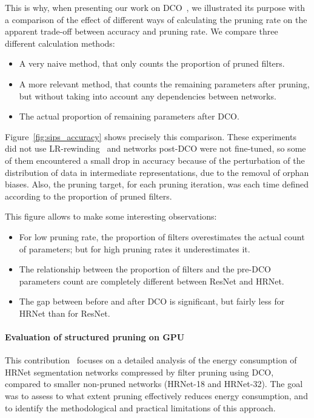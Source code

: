 \documentclass[11pt]{report}
\begin{document}
This is why, when presenting our work on DCO~\cite{tessier:hal-03767634}, we illustrated its purpose with a comparison of the effect of different ways of calculating the pruning rate on the apparent trade-off between accuracy and pruning rate. We compare three different calculation methods:
\begin{itemize}
  \item A very naive method, that only counts the proportion of pruned filters.
  \item A more relevant method, that counts the remaining parameters after pruning, but without taking into account any dependencies between networks.
  \item The actual proportion of remaining parameters after DCO.
\end{itemize}





Figure~\ref{fig:sips_accuracy} shows precisely this comparison. These experiments did not use LR-rewinding~\cite{renda2020comparing} and networks post-DCO were not fine-tuned, so some of them encountered a small drop in accuracy because of the perturbation of the distribution of data in intermediate representations, due to the removal of orphan biases. Also, the pruning target, for each pruning iteration, was each time defined according to the proportion of pruned filters.

This figure allows to make some interesting observations:
\begin{itemize}
  \item For low pruning rate, the proportion of filters overestimates the actual count of parameters; but for high pruning rates it underestimates it.
  \item The relationship between the proportion of filters and the pre-DCO parameters count are completely different between ResNet and HRNet.
  \item The gap between before and after DCO is significant, but fairly less for HRNet than for ResNet.
\end{itemize}


\paragraph{Evaluation of structured pruning on GPU}

This contribution~\cite{tessier:hal-03767636} focuses on a detailed analysis of the energy consumption of HRNet segmentation networks compressed by filter pruning using DCO, compared to smaller non-pruned networks (HRNet-18 and HRNet-32). The goal was to assess to what extent pruning effectively reduces energy consumption, and to identify the methodological and practical limitations of this approach.
\end{document}

